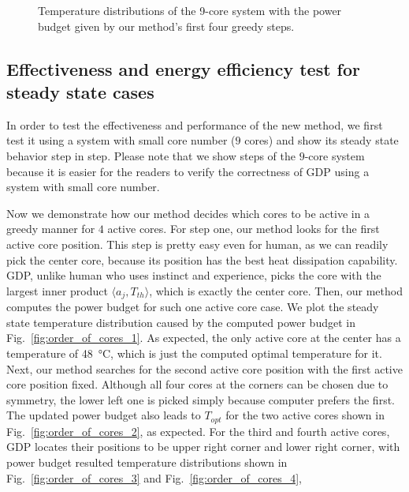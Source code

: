 \begin{figure}
{  }
  \hfill
  \caption{Temperature distributions of the 9-core system with the power budget given by our method's first four greedy steps.}
  \label{fig:order_of_cores}
\end{figure}

\subsection{Effectiveness and energy efficiency test for steady state cases}
In order to test the effectiveness and performance of the new method, we first test it
using a system with small core number ($9$ cores) and show its steady state
behavior step in step. Please note that we show steps of the $9$-core system
because it is easier for the readers to verify the correctness of GDP using
a system with small core number.

Now we demonstrate how our method decides which cores to be active in a
greedy manner for $4$ active cores. For step one, our method looks for the first
active core position. This step is pretty easy even for human, as we
can readily pick the center core, because its position has the best
heat dissipation capability. GDP, unlike human who uses instinct and
experience, picks the core with the largest inner product $\langle
a_j, T_{th}\rangle$, which is exactly the center core. 
Then, our method computes the power
budget for such one active core case. We plot the steady state temperature
distribution caused by the computed power budget in
Fig.~\ref{fig:order_of_cores_1}. As expected, the only active core at
the center has a temperature of \SI{48}{\degreeCelsius}, which is just
the computed optimal temperature for it. Next, our method searches for the
second active core position with the first active core position
fixed. Although all four cores at the corners can be chosen due to
symmetry, the lower left one is picked simply because computer prefers
the first. The updated power budget also leads to
$T_{opt}$ for the two active cores shown in Fig.~\ref{fig:order_of_cores_2}, as expected. For the
third and fourth active cores, GDP locates their positions to be 
upper right corner and lower right corner, with power budget
resulted temperature distributions shown in
Fig.~\ref{fig:order_of_cores_3} and Fig.~\ref{fig:order_of_cores_4},



